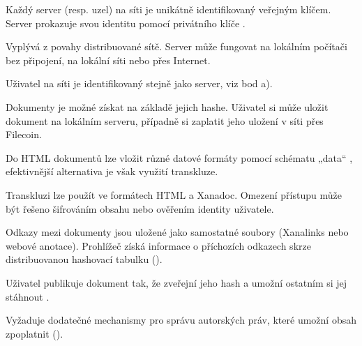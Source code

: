 \begin{enumerate}[a)]

Každý server (resp. uzel) na síti je unikátně identifikovaný veřejným klíčem. Server prokazuje svou identitu pomocí privátního klíče \autocite[3.1]{IPFS}.

Vyplývá z povahy distribuované sítě. Server může fungovat na lokálním počítači bez připojení, na lokální síti nebo přes Internet.

Uživatel na síti je identifikovaný stejně jako server, viz bod a).

Dokumenty je možné získat na základě jejich hashe. Uživatel si může uložit dokument na lokálním serveru, případně si zaplatit jeho uložení v síti přes Filecoin.

Do HTML dokumentů lze vložit různé datové formáty pomocí schématu „data“ \autocite{RFC2397}, efektivnější alternativa je však využití transkluze.

Transkluzi lze použít ve formátech HTML a Xanadoc. Omezení přístupu může být řešeno šifrováním obsahu nebo ověřením identity uživatele.

Odkazy mezi dokumenty jsou uložené jako samostatné soubory (Xanalinks nebo webové anotace). Prohlížeč získá informace o příchozích odkazech skrze distribuovanou hashovací tabulku (). 

Uživatel publikuje dokument tak, že zveřejní jeho hash a umožní ostatním si jej stáhnout \autocite[3.5.4]{IPFS}.

Vyžaduje dodatečné mechanismy pro správu autorských práv, které umožní obsah zpoplatnit ().


\end{enumerate}
